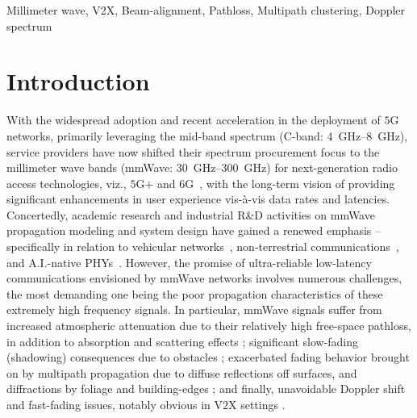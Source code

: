 \documentclass[12pt, draftcls, onecolumn]{IEEEtran}
\begin{document}
\begin{IEEEkeywords}
    Millimeter wave, V2X, Beam-alignment, Pathloss, Multipath clustering, Doppler spectrum
\end{IEEEkeywords}
\vspace{-4mm}

\section{Introduction}\label{S1}
With the widespread adoption and recent acceleration in the deployment of $5$G networks, primarily leveraging the mid-band spectrum (C-band: \SIrange{4}{8}{\giga\hertz}), service providers have now shifted their spectrum procurement focus to the millimeter wave bands (mmWave: \SIrange{30}{300}{\giga\hertz}) for next-generation radio access technologies, viz., $5$G$+$ and $6$G~\cite{mmWaveSurvey, Commercial, 5GBSurvey, 6GSurvey}, with the long-term vision of providing significant enhancements in user experience vis-\`{a}-vis data rates and latencies. Concertedly, academic research and industrial R\&D activities on mmWave propagation modeling and system design have gained a renewed emphasis -- specifically in relation to vehicular networks~\cite{VehicularBeamSelection, CVBeamAlignmentV2X}, non-terrestrial communications~\cite{mmWaveRuralNTNOpportunities, UAVBeamTracking}, and A.I.-native PHYs~\cite{6GAINative, OTAGANs}. However, the promise of ultra-reliable low-latency communications envisioned by mmWave networks involves numerous challenges, the most demanding one being the poor propagation characteristics of these extremely high frequency signals. In particular, mmWave signals suffer from increased atmospheric attenuation due to their relatively high free-space pathloss, in addition to absorption and scattering effects \cite{Rappaport}; significant slow-fading (shadowing) consequences due to obstacles \cite{SuburbanGeometryJournal}; exacerbated fading behavior brought on by multipath propagation due to diffuse reflections off surfaces, and diffractions by foliage and building-edges \cite{Outdoor28G}; and finally, unavoidable Doppler shift and fast-fading issues, notably obvious in V$2$X settings \cite{V2XBlockages}.
\end{document}
